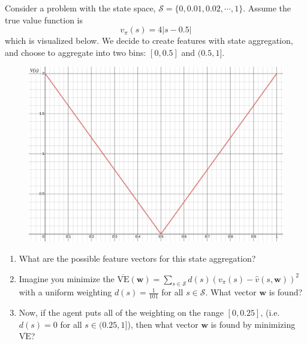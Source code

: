 Consider a problem with the state space, 
$\mathcal{S} =\{0,0.01,0.02,\cdots,1\}$. Assume the true value function is
\begin{equation*}
v_\pi(s) = 4|s-0.5|
\end{equation*}
%
which is visualized below. We decide to create features with state aggregation, and choose to aggregate into two bins: $[0, 0.5]$ and $(0.5, 1]$. 
\begin{figure}[h!]
  \center
  \includegraphics[width=0.7\linewidth]{figures/qweighting.png}
\end{figure}
\begin{enumerate}
  \item What are the possible feature vectors for this state aggregation?
  \item Imagine you minimize the $\overline{\text{VE}}(\mathbf{w}) = \sum_{s\in\mathcal{S}} d(s) (v_\pi(s) - \hat{v}(s, \mathbf{w}))^2$ with a uniform weighting 
	  $d(s) = \frac{1}{101}$ for all $s \in \mathcal{S}$. What vector $\mathbf{w}$ is found?
  \item Now, if the agent puts all of the weighting on the range $[0,0.25]$, (i.e. $d(s) = 0$ for all $s \in (0.25,1]$), then what  vector $\mathbf{w}$ is found by minimizing $\overline{\text{VE}}$?
\end{enumerate}
